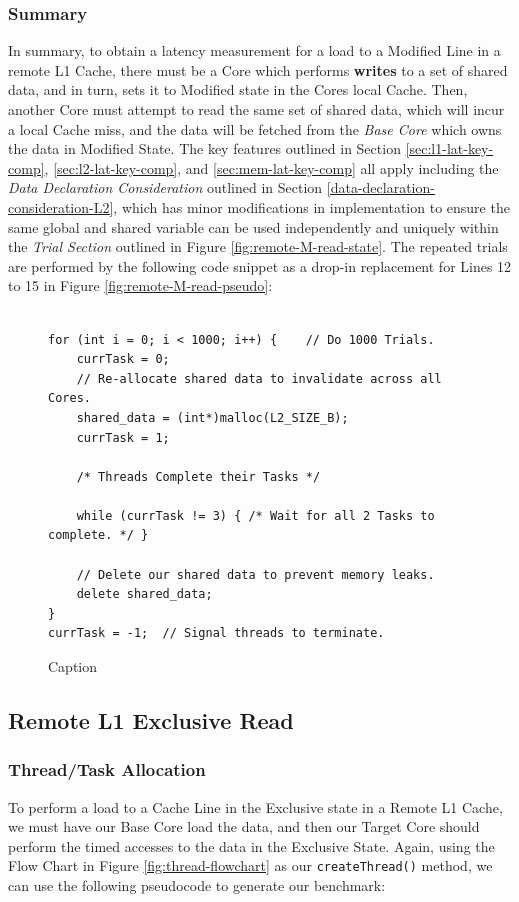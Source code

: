 \documentclass[bsc,frontabs,twoside,singlespacing,parskip,deptreport]{infthesis}     %
\begin{document}
\subsubsection{Summary}
In summary, to obtain a latency measurement for a load to a Modified Line in a remote L1 Cache, there must be a Core which performs \textbf{writes} to a set of shared data, and in turn, sets it to Modified state in the Cores local Cache. Then, another Core must attempt to read the same set of shared data, which will incur a local Cache miss, and the data will be fetched from the \emph{Base Core} which owns the data in Modified State. The key features outlined in Section \ref{sec:l1-lat-key-comp}, \ref{sec:l2-lat-key-comp}, and \ref{sec:mem-lat-key-comp} all apply including the \textit{Data Declaration Consideration} outlined in Section \ref{data-declaration-consideration-L2}, which has minor modifications in implementation to ensure the same global and shared variable can be used independently and uniquely within the \textit{Trial Section} outlined in Figure \ref{fig:remote-M-read-state}. The repeated trials are performed by the following code snippet as a drop-in replacement for Lines 12 to 15 in Figure \ref{fig:remote-M-read-pseudo}:
\begin{figure}[!h]
    \centering
    \begin{minipage}{0.8\textwidth}
    \begin{verbatim}

for (int i = 0; i < 1000; i++) {    // Do 1000 Trials.
    currTask = 0;
    // Re-allocate shared data to invalidate across all Cores.
    shared_data = (int*)malloc(L2_SIZE_B);
    currTask = 1;

    /* Threads Complete their Tasks */
        
    while (currTask != 3) { /* Wait for all 2 Tasks to complete. */ }
    
    // Delete our shared data to prevent memory leaks.
    delete shared_data;
}
currTask = -1;  // Signal threads to terminate.
    \end{verbatim}
    \end{minipage}
    \caption{Caption}
    \label{fig:remote-M-repeat}
\end{figure}


\subsection{Remote L1 Exclusive Read}
\subsubsection{Thread/Task Allocation}
To perform a load to a Cache Line in the Exclusive state in a Remote L1 Cache, we must have our Base Core load the data, and then our Target Core should perform the timed accesses to the data in the Exclusive State. Again, using the Flow Chart in Figure \ref{fig:thread-flowchart} as our \texttt{createThread()} method, we can use the following pseudocode to generate our benchmark:
\end{document}
